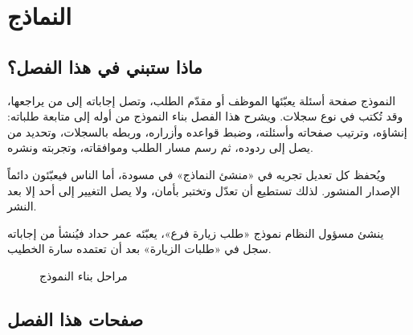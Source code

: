 \chapter{النماذج}
\label{ch:builder-forms}

\section{ماذا ستبني في هذا الفصل؟}
\label{sec:builder-forms-intro}

النموذج صفحة أسئلة يعبّئها الموظف أو مقدّم الطلب، وتصل إجاباته إلى من يراجعها، وقد تُكتب في نوع سجلات. ويشرح هذا الفصل بناء النموذج من أوله إلى متابعة طلباته: إنشاؤه، وترتيب صفحاته وأسئلته، وضبط قواعده وأزراره، وربطه بالسجلات، وتحديد من يصل إلى ردوده، ثم رسم مسار الطلب وموافقاته، وتجربته ونشره.

ويُحفظ كل تعديل تجريه في «منشئ النماذج» في مسودة، أما الناس فيعبّئون دائماً الإصدار المنشور. لذلك تستطيع أن تعدّل وتختبر بأمان، ولا يصل التغيير إلى أحد إلا بعد النشر.

\begin{rcnote}
ينشئ مسؤول النظام نموذج «طلب زيارة فرع»، يعبّئه عمر حداد فيُنشأ من إجاباته سجل في «طلبات الزيارة» بعد أن تعتمده سارة الخطيب.
\end{rcnote}

\begin{figure}[H]
\centering
{}
\rclegend
\caption{مراحل بناء النموذج}
\label{fig:builder-forms-overview}
\end{figure}

\section{صفحات هذا الفصل}
\label{sec:builder-forms-pages}

